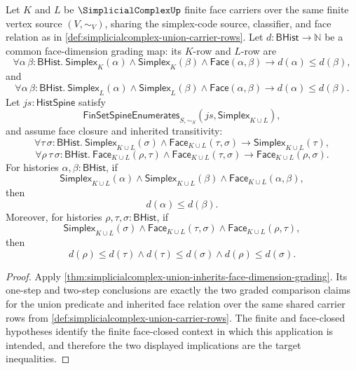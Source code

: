 \begin{lemma}\label{lem:simplicialcomplex-union-finite-face-closed-inherits-face-dimension-grading}
Let $K$ and $L$ be $\SimplicialComplexUp$ finite face carriers over the same finite vertex source $(V,\sim_V)$, sharing the simplex-code source, classifier, and face relation as in \autoref{def:simplicialcomplex-union-carrier-rows}. Let $d:\mathsf{BHist}\to\mathbb{N}$ be a common face-dimension grading map: its $K$-row and $L$-row are
$$
\forall \alpha\,\beta:\mathsf{BHist}.\
\mathsf{Simplex}_K(\alpha)\land
\mathsf{Simplex}_K(\beta)\land
\mathsf{Face}(\alpha,\beta)
\to
 d(\alpha)\le d(\beta),
$$
and
$$
\forall \alpha\,\beta:\mathsf{BHist}.\
\mathsf{Simplex}_L(\alpha)\land
\mathsf{Simplex}_L(\beta)\land
\mathsf{Face}(\alpha,\beta)
\to
 d(\alpha)\le d(\beta).
$$
Let $js:\mathsf{HistSpine}$ satisfy
$$
\mathsf{FinSetSpineEnumerates}_{S,\sim_S}(js,\mathsf{Simplex}_{K\cup L}),
$$
and assume face closure and inherited transitivity:
$$
\forall \tau\,\sigma:\mathsf{BHist}.\
\mathsf{Simplex}_{K\cup L}(\sigma)\land
\mathsf{Face}_{K\cup L}(\tau,\sigma)
\to
\mathsf{Simplex}_{K\cup L}(\tau),
$$
$$
\forall \rho\,\tau\,\sigma:\mathsf{BHist}.\
\mathsf{Face}_{K\cup L}(\rho,\tau)\land
\mathsf{Face}_{K\cup L}(\tau,\sigma)
\to
\mathsf{Face}_{K\cup L}(\rho,\sigma).
$$
For histories $\alpha,\beta:\mathsf{BHist}$, if
$$
\mathsf{Simplex}_{K\cup L}(\alpha)\land
\mathsf{Simplex}_{K\cup L}(\beta)\land
\mathsf{Face}_{K\cup L}(\alpha,\beta),
$$
then
$$
d(\alpha)\le d(\beta).
$$
Moreover, for histories $\rho,\tau,\sigma:\mathsf{BHist}$, if
$$
\mathsf{Simplex}_{K\cup L}(\sigma)
\land
\mathsf{Face}_{K\cup L}(\tau,\sigma)
\land
\mathsf{Face}_{K\cup L}(\rho,\tau),
$$
then
$$
d(\rho)\le d(\tau)
\land
 d(\tau)\le d(\sigma)
\land
 d(\rho)\le d(\sigma).
$$
\end{lemma}
\begin{proof}
Apply \autoref{thm:simplicialcomplex-union-inherits-face-dimension-grading}. Its one-step and two-step conclusions are exactly the two graded comparison claims for the union predicate and inherited face relation over the same shared carrier rows from \autoref{def:simplicialcomplex-union-carrier-rows}. The finite and face-closed hypotheses identify the finite face-closed context in which this application is intended, and therefore the two displayed implications are the target inequalities.
\end{proof}

